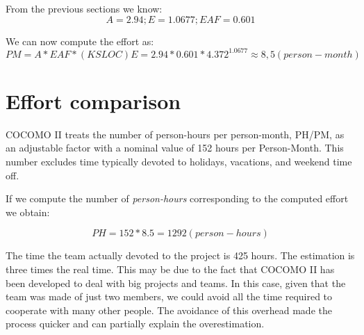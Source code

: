 \documentclass[10pt,a4paper,titlepage]{article}
\begin{document}
From the previous sections we know:
\[A=2.94; E=1.0677; EAF=0.601\]

We can now compute the effort as:
\[PM = A * EAF * (KSLOC)E = 2.94 * 0.601 * 4.372^{1.0677} \approx 8,5 (person-month)\]

\section{Effort comparison}
 
COCOMO II treats the number of person-hours per person-month, PH/PM, as an adjustable factor with a nominal value of 152 hours per Person-Month. This number excludes time typically devoted to holidays, vacations, and weekend time off.

If we compute the number of \textit{person-hours} corresponding to the computed effort we obtain:

\[PH = 152 * 8.5 = 1292(person-hours)\]

The time the team actually devoted to the project is 425 hours.
The estimation is three times the real time. This may be due to the fact that COCOMO II has been developed to deal with big projects and teams. In this case, given that the team was made of just two members, we could avoid all the time required to cooperate with many other people. The avoidance of this overhead made the process quicker and can partially explain the overestimation. 
\end{document}
